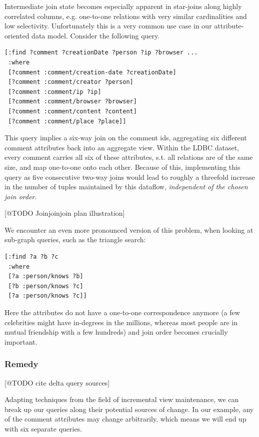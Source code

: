 \documentclass[../catalog.tex]{subfiles}
\begin{document}
Intermediate join state becomes especially apparent in star-joins
along highly correlated columns, e.g. one-to-one relations with very
similar cardinalities and low selectivity. Unfortunately this is a
very common use case in our attribute-oriented data model. Consider
the following query.

\begin{verbatim}
[:find ?comment ?creationDate ?person ?ip ?browser ...
 :where
 [?comment :comment/creation-date ?creationDate]
 [?comment :comment/creator ?person]
 [?comment :comment/ip ?ip]
 [?comment :comment/browser ?browser]
 [?comment :comment/content ?content]
 [?comment :comment/place ?place]]
\end{verbatim}

This query implies a six-way join on the comment ids, aggregating six
different comment attributes back into an aggregate view. Within the
LDBC dataset, every comment carries all six of these attributes,
s.t. all relations are of the same size, and map one-to-one onto each
other. Because of this, implementing this query as five consecutive
two-way joins would lead to roughly a threefold increase in the number
of tuples maintained by this dataflow, \emph{independent of the chosen
  join order}.

[@TODO Joinjoinjoin plan illustration]

We encounter an even more pronounced version of this problem, when
looking at sub-graph queries, such as the triangle search:

\begin{verbatim}
[:find ?a ?b ?c
 :where
 [?a :person/knows ?b]
 [?b :person/knows ?c]
 [?a :person/knows ?c]]
\end{verbatim}

Here the attributes do not have a one-to-one correspondence anymore (a
few celebrities might have in-degrees in the millions, whereas most
people are in mutual friendship with a few hundreds) and join order
becomes crucially important.

\subsubsection{Remedy}

[@TODO cite delta query sources]

Adapting techniques from the field of incremental view maintenance, we
can break up our queries along their potential sources of change. In
our example, any of the comment attributes may change arbitrarily,
which means we will end up with six separate queries.
\end{document}
